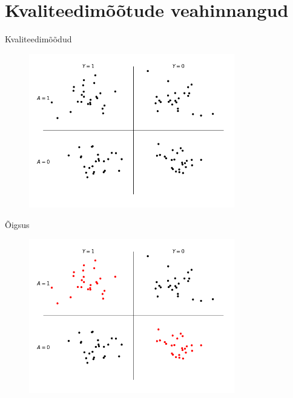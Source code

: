 \documentclass{beamer}
\begin{document}
\section{Kvaliteedimõõtude veahinnangud}

\begin{frame}{Kvaliteedimõõdud}
    \begin{figure}[H]
        \includegraphics[width=0.8\textwidth]{segadusmaatriks.png}
    \end{figure}
\end{frame}

\begin{frame}{Õigsus}
    \begin{figure}[H]
        \includegraphics[width=0.8\textwidth]{segadusmaatriks_oigsus.png}
    \end{figure}
\end{frame}
\end{document}
